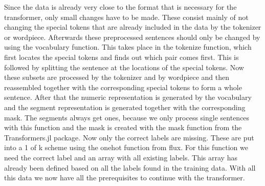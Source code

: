 Since the data is already very close to the format that is necessary for the transformer, only small changes have to be made. These consist mainly of not changing the special tokens that are already included in the data by the tokenizer or wordpiece. Afterwards these preprocessed sentences should only be changed by using the vocabulary function. This takes place in the tokenize function, which first locates the special tokens and finds out which pair comes first. This is followed by splitting the sentence at the locations of the special tokens. Now these subsets are processed by the tokenizer and by wordpiece and then reassembled together with the corresponding special tokens to form a whole sentence. After that the numeric representation is generated by the vocabulary and the segment representation is generated together with the corresponding mask. The segments always get ones, because we only process single sentences with this function and the mask is created with the mask function from the Transformers.jl package. Now only the correct labels are missing. These are put into a 1 of k scheme using the onehot function from flux. For this function we need the correct label and an array with all existing labels. This array has already been defined based on all the labels found in the training data. With all this data we now have all the prerequisites to continue with the transformer. 


